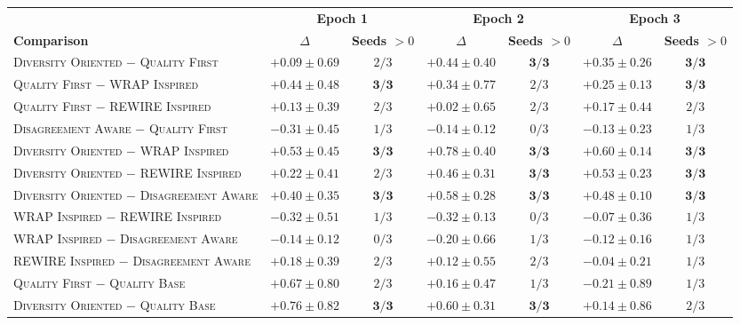 \begin{table}[t]
\begin{tabular}{lcccccc}
\toprule
& \multicolumn{2}{c}{\textbf{Epoch 1}} & \multicolumn{2}{c}{\textbf{Epoch 2}} & \multicolumn{2}{c}{\textbf{Epoch 3}} \\
\cmidrule(lr){2-3}\cmidrule(lr){4-5}\cmidrule(lr){6-7}
\textbf{Comparison} & \textbf{$\Delta$} & \textbf{Seeds $>0$} & \textbf{$\Delta$} & \textbf{Seeds $>0$} & \textbf{$\Delta$} & \textbf{Seeds $>0$} \\
\midrule
\textsc{Diversity Oriented} $-$ \textsc{Quality First} & $+0.09 \pm 0.69$ & $2/3$ & $+0.44 \pm 0.40$ & $\mathbf{3/3}$ & $+0.35 \pm 0.26$ & $\mathbf{3/3}$ \\
\textsc{Quality First} $-$ \textsc{WRAP Inspired} & $+0.44 \pm 0.48$ & $\mathbf{3/3}$ & $+0.34 \pm 0.77$ & $2/3$ & $+0.25 \pm 0.13$ & $\mathbf{3/3}$ \\
\textsc{Quality First} $-$ \textsc{REWIRE Inspired} & $+0.13 \pm 0.39$ & $2/3$ & $+0.02 \pm 0.65$ & $2/3$ & $+0.17 \pm 0.44$ & $2/3$ \\
\textsc{Disagreement Aware} $-$ \textsc{Quality First} & $-0.31 \pm 0.45$ & $1/3$ & $-0.14 \pm 0.12$ & $0/3$ & $-0.13 \pm 0.23$ & $1/3$ \\
\textsc{Diversity Oriented} $-$ \textsc{WRAP Inspired} & $+0.53 \pm 0.45$ & $\mathbf{3/3}$ & $+0.78 \pm 0.40$ & $\mathbf{3/3}$ & $+0.60 \pm 0.14$ & $\mathbf{3/3}$ \\
\textsc{Diversity Oriented} $-$ \textsc{REWIRE Inspired} & $+0.22 \pm 0.41$ & $2/3$ & $+0.46 \pm 0.31$ & $\mathbf{3/3}$ & $+0.53 \pm 0.23$ & $\mathbf{3/3}$ \\
\textsc{Diversity Oriented} $-$ \textsc{Disagreement Aware} & $+0.40 \pm 0.35$ & $\mathbf{3/3}$ & $+0.58 \pm 0.28$ & $\mathbf{3/3}$ & $+0.48 \pm 0.10$ & $\mathbf{3/3}$ \\
\textsc{WRAP Inspired} $-$ \textsc{REWIRE Inspired} & $-0.32 \pm 0.51$ & $1/3$ & $-0.32 \pm 0.13$ & $0/3$ & $-0.07 \pm 0.36$ & $1/3$ \\
\textsc{WRAP Inspired} $-$ \textsc{Disagreement Aware} & $-0.14 \pm 0.12$ & $0/3$ & $-0.20 \pm 0.66$ & $1/3$ & $-0.12 \pm 0.16$ & $1/3$ \\
\textsc{REWIRE Inspired} $-$ \textsc{Disagreement Aware} & $+0.18 \pm 0.39$ & $2/3$ & $+0.12 \pm 0.55$ & $2/3$ & $-0.04 \pm 0.21$ & $1/3$ \\
\midrule
\textsc{Quality First} $-$ \textsc{Quality Base} & $+0.67 \pm 0.80$ & $2/3$ & $+0.16 \pm 0.47$ & $1/3$ & $-0.21 \pm 0.89$ & $1/3$ \\
\textsc{Diversity Oriented} $-$ \textsc{Quality Base} & $+0.76 \pm 0.82$ & $\mathbf{3/3}$ & $+0.60 \pm 0.31$ & $\mathbf{3/3}$ & $+0.14 \pm 0.86$ & $2/3$ \\

\end{tabular}
\end{table}
